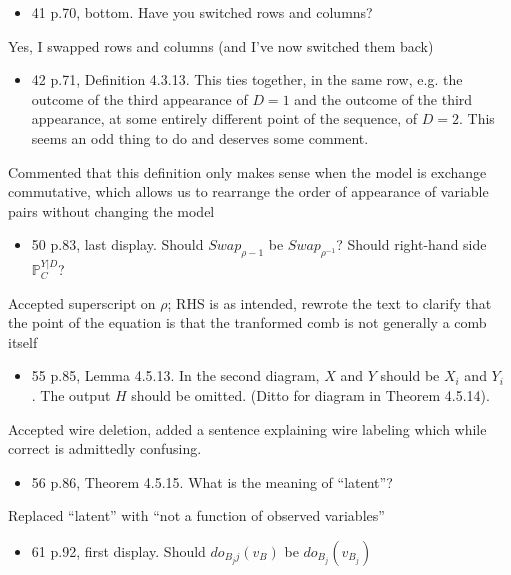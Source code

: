 \documentclass[12pt, a4paper]{article}
\begin{document}
\begin{itemize}
    \item 41 p.70, bottom. Have you switched rows and columns?
\end{itemize}
 

Yes, I swapped rows and columns (and I've now switched them back)

\begin{itemize}
    \item 42 p.71, Definition 4.3.13. This ties together, in the same row, e.g. the outcome of the third appearance of $D = 1$ and the outcome of the third appearance, at some entirely different point of the sequence, of $D = 2$. This seems an odd thing to do and deserves some comment.
\end{itemize}

Commented that this definition only makes sense when the model is exchange commutative, which allows us to rearrange the order of appearance of variable pairs without changing the model


\begin{itemize}
    \item  50 p.83, last display. Should $Swap_{\rho - 1}$ be $Swap_{\rho^{-1}}$? Should right-hand side $\mathbb{P}^{Y|D}_C$?
\end{itemize}


Accepted superscript on $\rho$; RHS is as intended, rewrote the text to clarify that the point of the equation is that the tranformed comb is not generally a comb itself

\begin{itemize}
    \item 55 p.85, Lemma 4.5.13. In the second diagram, $X$ and $Y$ should be $X_i$ and $Y_i$ . The output $H$ should be omitted. (Ditto for diagram in Theorem 4.5.14).
\end{itemize}
 

Accepted wire deletion, added a sentence explaining wire labeling which while correct is admittedly confusing.

\begin{itemize}
    \item 56 p.86, Theorem 4.5.15. What is the meaning of ``latent''?
\end{itemize}
 

Replaced ``latent'' with ``not a function of observed variables''

\begin{itemize}
    \item 61 p.92, first display. Should $do_{B_j j}(v_B )$ be $do_{B_j} (v_{B_j} )$
\end{itemize}
\end{document}
